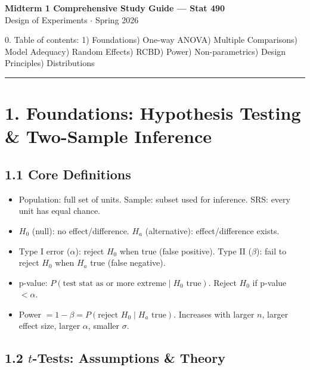 \documentclass[9pt,letterpaper]{article}
\begin{document}
\vspace*{-0.25in}
\begin{center}
{\large \textbf{Midterm 1 Comprehensive Study Guide --- Stat 490}}\\[-2pt]
{\scriptsize Design of Experiments $\cdot$ Spring 2026}
\end{center}

{\footnotesize 0. Table of contents: 1) Foundations) One-way ANOVA) Multiple Comparisons) Model Adequacy) Random Effects) RCBD) Power) Non-parametrics) Design Principles) Distributions}
\vspace{2pt}\hrule\vspace{2pt}

\section{1. Foundations: Hypothesis Testing \& Two-Sample Inference}

\subsection{1.1 Core Definitions}
\begin{itemize}
    \item Population: full set of units. Sample: subset used for inference. SRS: every unit has equal chance.
    \item $H_0$ (null): no effect/difference. $H_a$ (alternative): effect/difference exists.
    \item Type I error ($\alpha$): reject $H_0$ when true (false positive). Type II ($\beta$): fail to reject $H_0$ when $H_a$ true (false negative).
    \item p-value: $P(\text{test stat as or more extreme} \mid H_0 \text{ true})$. Reject $H_0$ if p-value $< \alpha$.
    \item Power $=1-\beta = P(\text{reject } H_0 \mid H_a \text{ true})$. Increases with larger $n$, larger effect size, larger $\alpha$, smaller $\sigma$.
\end{itemize}

\subsection{1.2 $t$-Tests: Assumptions \& Theory}
\end{document}
